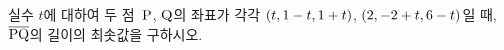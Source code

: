 실수 $t$에 대하여 두 점~$\mathrm{P}$, $\mathrm{Q}$의 좌표가 각각 $(t{,}\mkern3mu\mathopen{}1-t{,}\mkern3mu\mathopen{}1+t)$, $(2{,}\mkern3mu\mathopen{}-2+t{,}\mkern3mu\mathopen{}6-t)$일 때, $\overline{\mathrm{PQ}}$의 길이의 최솟값을 구하시오.
